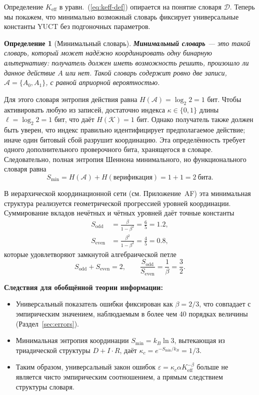 \documentclass[12pt,a4paper]{article}
\newtheorem{definition}[theorem]{Определение}
\theoremstyle{remark}
\begin{document}
	Определение \(K_{\mathrm{eff}}\) в уравн.~(\ref{eq:keff-def}) опирается на понятие словаря \(\mathcal{D}\). Теперь мы покажем, что минимально возможный словарь фиксирует универсальные константы YUCT без подгоночных параметров.
	
	\begin{definition}[Минимальный словарь]
		\textbf{Минимальный словарь} — это такой словарь, который может надёжно координировать одну бинарную альтернативу: получатель должен иметь возможность решить, произошло ли данное действие \(A\) или нет. Такой словарь содержит ровно две записи, \(\mathcal{A} = \{A_0, A_1\}\), с равной априорной вероятностью.
	\end{definition}
	
	Для этого словаря энтропия действия равна \(H(\mathcal{A}) = \log_2 2 = 1\) бит. Чтобы активировать любую из записей, достаточно индекса \(\kappa \in \{0,1\}\) длины \(\ell = \log_2 2 = 1\) бит, что даёт \(H(\mathcal{K}) = 1\) бит. Однако получатель также должен быть уверен, что индекс правильно идентифицирует предполагаемое действие; иначе один битовый сбой разрушит координацию. Эта определённость требует одного дополнительного проверочного бита, хранящегося в словаре. Следовательно, полная энтропия Шеннона минимального, но функционального словаря равна
	\begin{equation}
		S_{\min} = H(\mathcal{A}) + H(\text{верификация}) = 1 + 1 = 2\ \text{бита}.
		\label{eq:smin}
	\end{equation}
	
	В иерархической координационной сети (см. Приложение~AF) эта минимальная структура реализуется геометрической прогрессией уровней координации. Суммирование вкладов нечётных и чётных уровней даёт точные константы
	\begin{align}
		S_{\mathrm{odd}} &= \frac{\beta}{1-\beta^{2}} = \frac{6}{5} = 1.2, \label{eq:sodd-appx}\\
		S_{\mathrm{even}} &= \frac{\beta^{2}}{1-\beta^{2}} = \frac{4}{5} = 0.8, \label{eq:seven-appx}
	\end{align}
	которые удовлетворяют замкнутой алгебраической петле
	\begin{equation}
		S_{\mathrm{odd}} + S_{\mathrm{even}} = 2, \qquad
		\frac{S_{\mathrm{odd}}}{S_{\mathrm{even}}} = \frac{1}{\beta} = \frac{3}{2}.
		\label{eq:algebraic-loop-appx}
	\end{equation}
	
	\textbf{Следствия для обобщённой теории информации:}
	\begin{itemize}
		\item Универсальный показатель ошибки фиксирован как \(\beta = 2/3\), что совпадает с эмпирическим значением, наблюдаемым в более чем 40 порядках величины (Раздел~\ref{sec:errors}).
		\item Минимальная энтропия координации \(S_{\min} = k_B \ln 3\), вытекающая из триадической структуры \(D+I\!\cdot\!R\), даёт \(\kappa_c = e^{-S_{\min}/k_B} = 1/3\).
		\item Таким образом, универсальный закон ошибок \(\varepsilon = \kappa_c \alpha K_{\mathrm{eff}}^{-\beta}\) больше не является чисто эмпирическим соотношением, а прямым следствием структуры словаря.
	\end{itemize}
	
\end{document}
